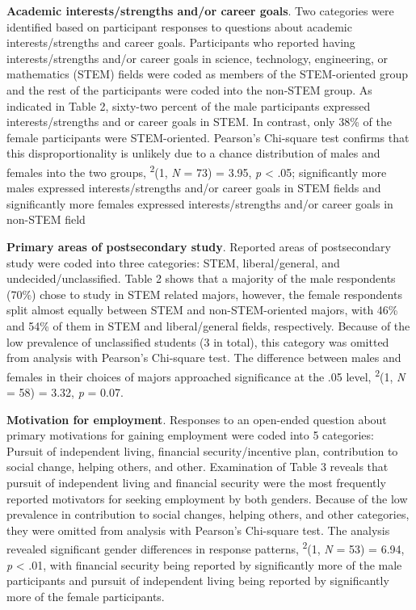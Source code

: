 \documentclass[11.5pt]{sig-alternate} %
\begin{document}
\begin{large}
\textbf{Academic interests/strengths and/or career goals}. Two categories were identified based on participant responses to questions about academic interests/strengths and career goals. Participants who reported having interests/strengths and/or career goals in science, technology, engineering, or mathematics (STEM) fields were coded as members of the STEM-oriented group and the rest of the participants were coded into the non-STEM group. As indicated in Table 2, sixty-two percent of the male participants expressed interests/strengths and or career goals in STEM. In contrast, only 38\% of the female participants were STEM-oriented. Pearson’s Chi-square test confirms that this disproportionality is unlikely due to a chance distribution of males and females into the two groups, \textchi\textsuperscript{2}(1, \textit{N} = 73) = 3.95, \textit{p} < .05; significantly more males expressed interests/strengths and/or career goals in STEM fields and significantly more females expressed interests/strengths and/or career goals in non-STEM field 
 
\textbf{Primary areas of postsecondary study}. Reported areas of postsecondary study were coded into three categories: STEM, liberal/general, and undecided/unclassified. Table 2 shows that a majority of the male respondents (70\%) chose to study in STEM related majors, however, the female respondents split almost equally between STEM and non-STEM-oriented majors, with 46\% and 54\% of them in STEM and liberal/gen\-eral fields, respectively. Because of the low prevalence of unclassified students (3 in total), this category was omitted from analysis with Pearson’s Chi-square test. The difference between males and females in their choices of majors approached significance at the .05 level, \textchi\textsuperscript{2}(1, \textit{N} = 58) = 3.32, \textit{p} = 0.07. 

\textbf{Motivation for employment}. Responses to an open-ended question about primary motivations for gaining employment were coded into 5 categories: Pursuit of independent living, financial security/incentive plan, contribution to social change, helping others, and other. Examination of Table 3 reveals that pursuit of independent living and financial security were the most frequently reported motivators for seeking employment by both genders. Because of the low prevalence in contribution to social changes, helping others, and other categories, they were omitted from analysis with Pearson’s Chi-square test. The analysis revealed significant gender differences in response patterns, \textchi\textsuperscript{2}(1, \textit{N} = 53) = 6.94, \textit{p} < .01, with financial security being reported by significantly more of the male participants and pursuit of independent living being reported by significantly more of the female participants. 


\end{large}
\end{document}
